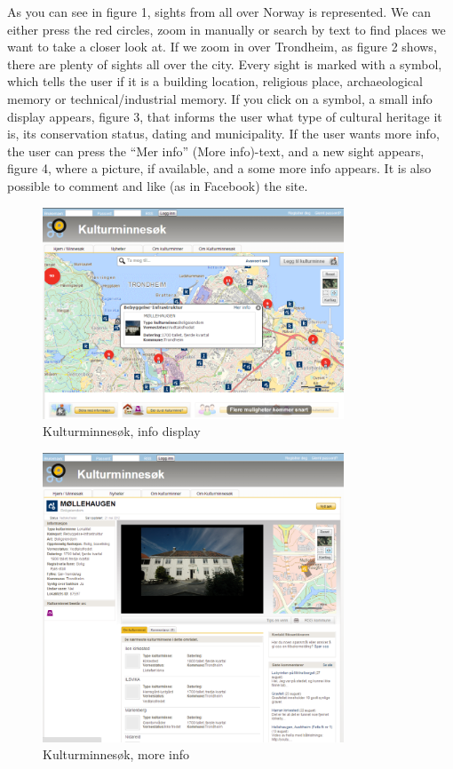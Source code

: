 \documentclass[11pt]{book}
\begin{document}
As you can see in figure 1, sights from all over Norway is represented. We can either press the red circles, zoom in manually or search by text to find places we want to take a closer look at. If we zoom in over Trondheim, as figure 2 shows, there are plenty of sights all over the city. Every sight is marked with a symbol, which tells the user if it is a building location, religious place, archaeological memory or technical/industrial memory. If you click on a symbol, a small info display appears, figure 3, that informs the user what type of cultural heritage it is, its conservation status, dating and municipality. If the user wants more info, the user can press the “Mer info” (More info)-text, and  a new sight appears, figure 4, where a picture, if available, and a some more info appears. It is also possible to comment and like (as in Facebook) the site.

\begin{figure}[H]
      \centering
      \includegraphics[width=0.8\textwidth]{Figures/Prestudy/kulturminnesokClick.png}
      \caption{Kulturminnesøk, info display}
      \label{fig:pre_kulturInfo}
\end{figure}

\begin{figure}[H]
      \centering
      \includegraphics[width=0.8\textwidth]{Figures/Prestudy/kulturminnesokMoreInfo.png}
      \caption{Kulturminnesøk, more info}
      \label{fig:pre_kulturMoreInfo}
\end{figure}
\end{document}

